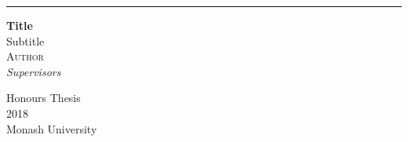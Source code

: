 \begin{titlepage}
\noindent
\begin{minipage}{\textwidth}
\rule{1.5pt}{0.3\textheight}%

\vspace{5mm}
\noindent
{\Huge\textbf{Title} \\[0.3\baselineskip]
\Large Subtitle}\\[2\baselineskip]
{\LARGE \textsc{Author}\\[4\baselineskip]
{\large \textit{Supervisors}}} %

\vspace{0.1\textheight} %
\noindent
Honours Thesis\\
2018\\
Monash University
\\[\baselineskip]
\makebox[0pt][l]{\rule{1.5pt}{0.35\textheight}}%
\end{minipage}
\end{titlepage}
